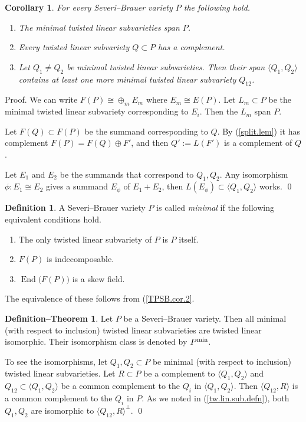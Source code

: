 \documentclass{amsart}
\newtheorem{cor}[thm]{Corollary}
\theoremstyle{definition}
\newtheorem{defn}[thm]{Definition}
\newtheorem{defn-thm}[thm]{Definition--Theorem}  %
\theoremstyle{remark}
\newcommand{\End}[0]{\operatorname{End}}
\begin{document}
\begin{cor} \label{TPSB.min.lem.3.cor.2} For every  Severi--Brauer variety $P$ the following hold. 
\begin{enumerate}
\item The minimal twisted linear subvarieties span $P$.
  \item Every twisted linear subvariety $Q\subset P$ has a complement.
\item Let $Q_1\neq  Q_2$  be minimal twisted linear subvarieties. Then  their span 
$\langle Q_1, Q_2\rangle$ contains at least one more minimal twisted linear subvariety
$Q_{12}$. 
\end{enumerate}
\end{cor}

Proof.  We can write $F(P)\cong \oplus_m E_m$ where $E_m\cong E(P)$. Let
$L_m\subset P$ be the  minimal twisted linear subvariety corresponding to $E_i$. Then the $L_m$ span $P$.

Let $F(Q)\subset F(P)$ be the summand corresponding to $Q$. By (\ref{split.lem}) it has complement  $F(P)=F(Q)\oplus F'$, and then $Q':=L(F')$ is a complement of $Q$. 

Let $E_1$ and $E_2$ be the summands that correspond to  $Q_1, Q_2$.
Any isomorphism $\phi:E_1\cong E_2$ gives a summand
$E_\phi$ of $E_1+E_2$, then $L(E_\phi)\subset \langle Q_1, Q_2\rangle$ works.
\qed



\begin{defn}\label{TPSB.cor.3} A Severi--Brauer variety $P$ is 
called {\it minimal} if the  following
equivalent conditions hold.
\begin{enumerate}
\item The only twisted linear subvariety of $P$ is $P$ itself. 
\item $F(P)$ is indecomposable.
\item $\End\bigl(F(P)\bigr)$ is a skew field. 
\end{enumerate}

The equivalence of these follows from (\ref{TPSB.cor.2}.
\end{defn}



\begin{defn-thm} \label{twisted.basic.thm} Let $P$ be a Severi--Brauer variety. Then all minimal (with respect to inclusion) twisted linear subvarieties
are twisted linear isomorphic. Their isomorphism class is denoted by $P^{\rm min}$.

To see the isomorphisms, let   $Q_1, Q_2\subset P$ be 
minimal (with respect to inclusion) twisted linear subvarieties.
Let $R\subset P$ be  a complement to $\langle Q_1, Q_2\rangle$ and
$Q_{12}\subset \langle Q_1, Q_2\rangle$ be a common complement to the $Q_i$ in $\langle Q_1, Q_2\rangle$. Then $\langle Q_{12}, R\rangle$ is a
common complement to the $Q_i$ in $P$. As we noted in (\ref{tw.lin.sub.defn}), both $Q_1,  Q_2$  are isomorphic to  $\langle Q_{12}, R\rangle^\perp$. \qed
\end{defn-thm}
\end{document}
